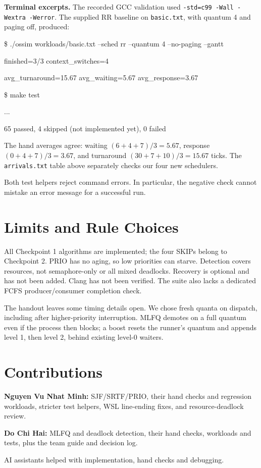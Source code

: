 \documentclass[11pt,a4paper,twocolumn]{article}
\newcommand{\code}[1]{\texttt{#1}}
\begin{document}
\textbf{Terminal excerpts.}
The recorded GCC validation used
\code{-std=c99 -Wall -Wextra -Werror}. The supplied RR baseline on
\code{basic.txt}, with quantum 4 and paging off, produced:

\begingroup
\footnotesize\ttfamily\raggedright
\$ ./ossim workloads/basic.txt --sched rr --quantum 4 --no-paging --gantt\par
finished=3/3 context\_switches=4\par
avg\_turnaround=15.67 avg\_waiting=5.67 avg\_response=3.67\par
\$ make test\par
...\par
65 passed, 4 skipped (not implemented yet), 0 failed\par
\endgroup

The hand averages agree: waiting \((6+4+7)/3=5.67\), response
\((0+4+7)/3=3.67\), and turnaround \((30+7+10)/3=15.67\) ticks.
The \code{arrivals.txt} table above separately checks our four new
schedulers.

Both test helpers reject command errors. In particular, the negative
check cannot mistake an error message for a successful run.

\section{Limits and Rule Choices}

All Checkpoint 1 algorithms are implemented; the four SKIPs belong to
Checkpoint 2. PRIO has no aging, so low priorities can starve. Detection
covers resources, not semaphore-only or all mixed deadlocks. Recovery is
optional and has not been added. Clang has not been verified. The suite
also lacks a dedicated FCFS producer/consumer completion check.

The handout leaves some timing details open. We chose fresh quanta on
dispatch, including after higher-priority interruption. MLFQ demotes on
a full quantum even if the process then blocks; a boost resets the
runner's quantum and appends level 1, then level 2, behind existing
level-0 waiters.

\section{Contributions}

\textbf{Nguyen Vu Nhat Minh:} SJF/SRTF/PRIO, their hand checks and
regression workloads, stricter test helpers, WSL line-ending fixes, and
resource-deadlock review.

\textbf{Do Chi Hai:} MLFQ and deadlock detection, their hand checks,
workloads and tests, plus the team guide and decision log.

AI assistants helped with implementation, hand checks and debugging.
\end{document}
